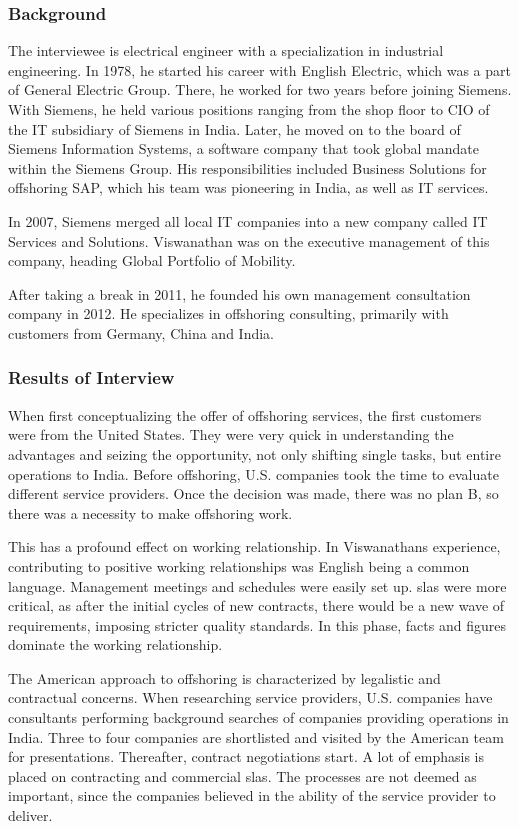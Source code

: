 \subsubsection{Background}
The interviewee is electrical engineer with a specialization in industrial engineering. In 1978, he started his career with English Electric, which was a part of General Electric Group. There, he worked for two years before joining Siemens. With Siemens, he held various positions ranging from the shop floor to CIO of the IT subsidiary of Siemens in India. Later, he moved on to the board of Siemens Information Systems, a software company that took global mandate within the Siemens Group. His responsibilities included Business Solutions for offshoring SAP, which his team was pioneering in India, as well as IT services.

In 2007, Siemens merged all local IT companies into a new company called IT Services and Solutions. Viswanathan was on the executive management of this company, heading Global Portfolio of Mobility.

After taking a break in 2011, he founded his own management consultation company in 2012. He specializes in offshoring consulting, primarily with customers from Germany, China and India.

\subsubsection{Results of Interview}
When first conceptualizing the offer of offshoring services, the first customers were from the United States. They were very quick in understanding the advantages and seizing the opportunity, not only shifting single tasks, but entire operations to India. Before offshoring, U.S. companies took the time to evaluate different service providers. Once the decision was made, there was no plan B, so there was a necessity to make offshoring work.

This has a profound effect on working relationship. In Viswanathans experience, contributing to positive working relationships was English being a common language. Management meetings and schedules were easily set up. \Glspl{sla} were more critical, as after the initial cycles of new contracts, there would be a new wave of requirements, imposing stricter quality standards. In this phase, facts and figures dominate the working relationship.

The American approach to offshoring is characterized by legalistic and contractual concerns. When researching service providers, U.S. companies have consultants performing background searches of companies providing operations in India. Three to four companies are shortlisted and visited by the American team for presentations. Thereafter, contract negotiations start. A lot of emphasis is placed on contracting and commercial \glspl{sla}. The processes are not deemed as important, since the companies believed in the ability of the service provider to deliver.

